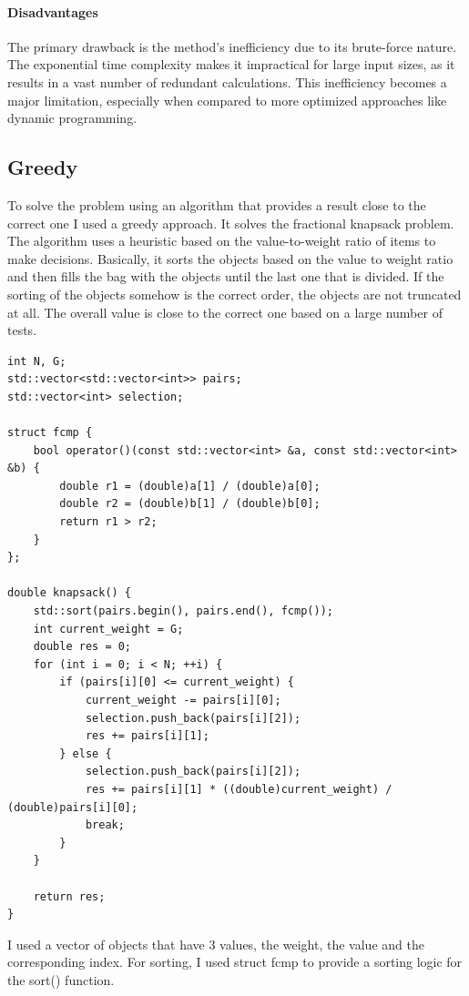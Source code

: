 \documentclass{llncs}
\begin{document}
\paragraph{Disadvantages}
The primary drawback is the method's inefficiency due to its brute-force nature. The exponential 
time complexity makes it impractical for large input sizes, as it results in a vast number of
redundant calculations. This inefficiency becomes a major limitation, especially when compared to
more optimized approaches like dynamic programming.


\subsection{Greedy}

To solve the problem using an algorithm that provides a result close to the correct one I used a
greedy approach. It solves the fractional knapsack problem. The algorithm uses a heuristic based on
the value-to-weight ratio of items to make decisions. Basically, it sorts the objects based on the
value to weight ratio and then fills the bag with the objects until the last one that is divided.
If the sorting of the objects somehow is the correct order, the objects are not truncated at all.
The overall value is close to the correct one based on a large number of tests.

\begin{lstlisting}
int N, G;
std::vector<std::vector<int>> pairs;
std::vector<int> selection;

struct fcmp {
    bool operator()(const std::vector<int> &a, const std::vector<int> &b) {
        double r1 = (double)a[1] / (double)a[0];
        double r2 = (double)b[1] / (double)b[0];
        return r1 > r2;
    }
};

double knapsack() {
    std::sort(pairs.begin(), pairs.end(), fcmp());
    int current_weight = G;
    double res = 0;
    for (int i = 0; i < N; ++i) {
        if (pairs[i][0] <= current_weight) {
            current_weight -= pairs[i][0];
            selection.push_back(pairs[i][2]);
            res += pairs[i][1];
        } else {
            selection.push_back(pairs[i][2]);
            res += pairs[i][1] * ((double)current_weight) / (double)pairs[i][0];
            break;
        }
    }

    return res;
}
\end{lstlisting}

I used a vector of objects that have 3 values, the weight, the value and the corresponding index.
For sorting, I used struct fcmp to provide a sorting logic for the sort() function.
\end{document}
